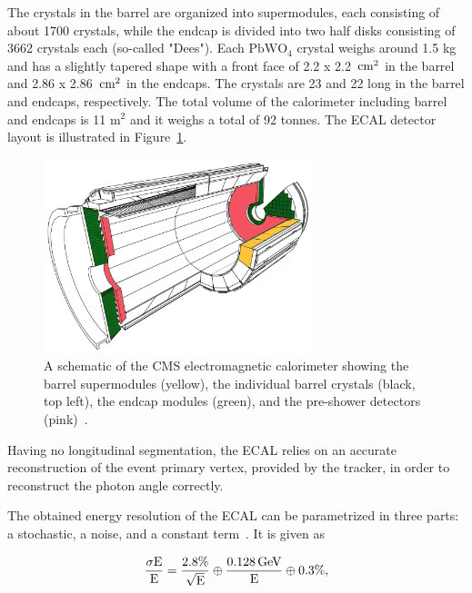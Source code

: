 The  crystals in the barrel are organized into supermodules, each consisting of about 1700 crystals, while the endcap is divided into two half disks consisting of 3662 crystals each (so-called "Dees").
Each $\textrm{PbWO}_4$ crystal weighs around 1.5 kg and has a slightly tapered shape with a front face of 2.2 x 2.2 $\,\text{cm}^2$ in the barrel and 2.86 x 2.86 $\,\text{cm}^2$ in the endcaps. The crystals are 23 and 22 \cm long in the barrel and endcaps, respectively. The total volume of the calorimeter including barrel and endcaps is 11 $\textrm{m}^2$ and it weighs a total of 92 tonnes.
The ECAL detector layout is illustrated in Figure~\ref{fig:cms:ecal}.
\begin{figure}[h] 
    \centering
    \includegraphics[width=0.7\textwidth]{figures/cms/ecal.jpg}
    \caption{A schematic of the CMS electromagnetic calorimeter showing the barrel supermodules (yellow), the individual barrel crystals (black, top left), the endcap modules (green), and the pre-shower detectors (pink)~\cite{Chatrchyan:2008aa}.}
    \label{fig:cms:ecal}
\end{figure}

Having no longitudinal segmentation, the ECAL relies on an accurate reconstruction of the event primary vertex, provided by the tracker, in order to reconstruct the photon angle correctly.

The obtained energy resolution of the ECAL can be parametrized in three parts: a stochastic, a noise, and a constant term~\cite{Adzic:2007mi}. It is given as

\begin{equation*}
  \frac{\sigma \textrm{E}}{\textrm{E}} = \frac{2.8 \%}{\sqrt{\textrm{E}}}\oplus\frac{0.128 \,\text{Ge\hspace{-.08em}V}}{\textrm{E}}\oplus 0.3 \%,
\end{equation*}

